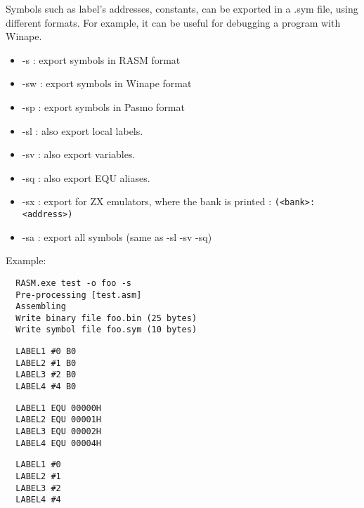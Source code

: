 \begin{xen}
Symbols such as label's addresses, constants, can be exported in a .sym file, using different formats.
For example, it can be useful for debugging a program with Winape.
  \begin{itemize}
    \item -s : export symbols in RASM format
    \item -sw :	export symbols in Winape format
    \item -sp :	export symbols in Pasmo format
    \item -sl :	also export local labels.
    \item -sv :	also export variables.
    \item -sq :	also export EQU aliases.
    \item -sx : export for ZX emulators, where the bank is printed :  \texttt{(<bank>:<address>)}
    \item -sa :	export all symbols (same as -sl -sv -sq)
  \end{itemize}
  Example:
\end{xen}

\begin{verbatim}
  RASM.exe test -o foo -s
  Pre-processing [test.asm]
  Assembling
  Write binary file foo.bin (25 bytes)
  Write symbol file foo.sym (10 bytes)
\end{verbatim}


\begin{verbatim}
  LABEL1 #0 B0
  LABEL2 #1 B0
  LABEL3 #2 B0
  LABEL4 #4 B0
\end{verbatim}


\begin{verbatim}
  LABEL1 EQU 00000H
  LABEL2 EQU 00001H
  LABEL3 EQU 00002H
  LABEL4 EQU 00004H
\end{verbatim}


\begin{verbatim}
  LABEL1 #0
  LABEL2 #1
  LABEL3 #2
  LABEL4 #4
\end{verbatim}



